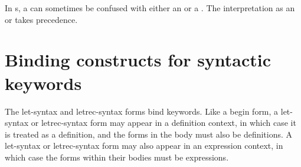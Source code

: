 \begin{entry}{%
}
In s, a  can sometimes
be confused with either an  or a .  The interpretation as an
 or  takes precedence.

\end{entry}

\section{Binding constructs for syntactic keywords}
\label{bindsyntax}

The {\cf let-syntax} and {\cf letrec-syntax} forms 
bind keywords.
Like a {\cf begin} form, a {\cf let-syntax} or {\cf letrec-syntax} form
may appear in a definition context, in which case it is treated as a
definition, and the forms in the body must also be
definitions.
A {\cf let-syntax} or {\cf letrec-syntax} form may also appear in an
expression context, in which case the forms within their bodies must be
expressions.


